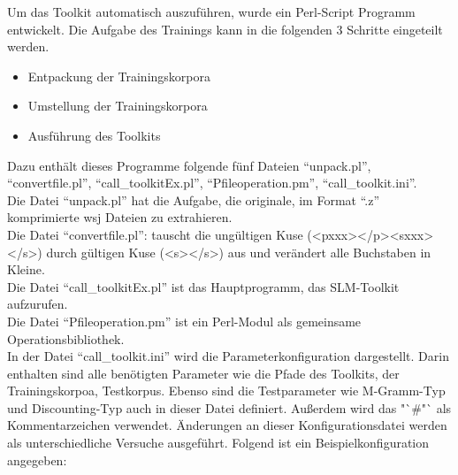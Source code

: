 
Um das Toolkit automatisch auszuf\"uhren, wurde ein Perl-Script Programm entwickelt. Die Aufgabe des Trainings kann in die folgenden  3 Schritte eingeteilt werden.
\begin{itemize}
	\item Entpackung der Trainingskorpora
	\item Umstellung der Trainingskorpora
	\item Ausf\"uhrung des Toolkits
\end{itemize}
Dazu enth\"alt dieses Programme folgende f\"unf Dateien "`unpack.pl"', "`convertfile.pl"', "`call\_toolkitEx.pl"', "`Pfileoperation.pm"',  "`call\_toolkit.ini"'.\\
Die Datei "`unpack.pl"' hat die Aufgabe, die originale, im Format "`.z"' komprimierte  wsj Dateien zu extrahieren.\\
Die Datei "`convertfile.pl"': tauscht die ung\"ultigen Kuse (<pxxx></p><sxxx></s>) durch g\"ultigen Kuse (<s></s>) aus und ver\"andert alle Buchstaben in Kleine. \\
Die Datei "`call\_toolkitEx.pl"' ist das Hauptprogramm, das SLM-Toolkit aufzurufen.\\ 
Die Datei "`Pfileoperation.pm"' ist ein Perl-Modul\cite{book_perl} als gemeinsame Operationsbibliothek.\\
In der Datei "`call\_toolkit.ini"'  wird die Parameterkonfiguration dargestellt. Darin enthalten sind alle ben\"otigten Parameter wie die Pfade des Toolkits, der Trainingskorpoa, Testkorpus. Ebenso sind die Testparameter wie M-Gramm-Typ und Discounting-Typ auch in dieser Datei definiert. Au\ss erdem wird das "`\#"`  als Kommentarzeichen verwendet. \"Anderungen an dieser Konfigurationsdatei werden als unterschiedliche Versuche ausgef\"uhrt. Folgend ist ein Beispielkonfiguration angegeben:

